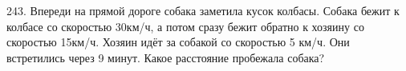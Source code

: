 243. Впереди на прямой дороге собака заметила кусок колбасы. Собака бежит к колбасе со скоростью 30км/ч, а потом сразу бежит обратно к хозяину со скоростью 15км/ч. Хозяин идёт за собакой со скоростью 5 км/ч. Они встретились через 9 минут. Какое расстояние пробежала собака?\\
